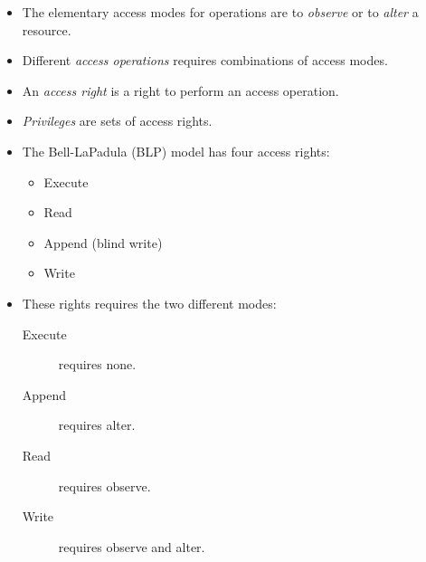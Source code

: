 \documentclass{beamer}
\begin{document}
\begin{frame}
  \begin{definition}
    \begin{itemize}
      \item The elementary access modes for operations are to \emph{observe} or 
        to \emph{alter} a resource.

      \item Different \emph{access operations} requires combinations of access 
        modes.
    \end{itemize}
  \end{definition}

  \pause{}

  \begin{definition}
    \begin{itemize}
      \item An \emph{access right} is a right to perform an access operation.

      \item \emph{Privileges} are sets of access rights.
    \end{itemize}
  \end{definition}
\end{frame}

\begin{frame}
  \begin{example}[BLP]
    \begin{itemize}
      \item The Bell-LaPadula (BLP) model has four access rights:
        \begin{itemize}
          \item Execute
          \item Read
          \item Append (blind write)
          \item Write
        \end{itemize}

      \item These rights requires the two different modes:
        \begin{description}
          \item[Execute] requires none.
          \item[Append] requires alter.
          \item[Read] requires observe.
          \item[Write] requires observe and alter.
        \end{description}
    \end{itemize}
  \end{example}
\end{frame}
\end{document}
